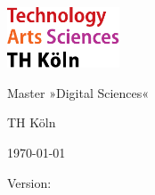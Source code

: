 
\begin{titlepage}

	\includegraphics[width=0.25\textwidth]{../../assets/logo_th_koeln.pdf}

	\vspace{2cm}
	{\Large\raggedright \docname \par}
	\vspace{-1cm}
	{\Huge\singlespacing Master »Digital Sciences« \par}
	\vspace{1cm}
	{\Large TH Köln\par}

	\vfill

	{\Large \today \par}

	{\small Version:
	
	\par}
\end{titlepage}

